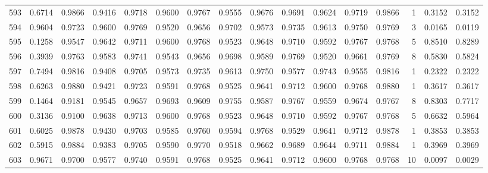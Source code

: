 \begin{tabular}{lrrrrrrrrrrrrrrr}
593 &      0.6714 &  0.9866 &  0.9416 &  0.9718 &  0.9600 &  0.9767 &  0.9555 &  0.9676 &  0.9691 &  0.9624 &   0.9719 &     0.9866 &      1 &                    0.3152 &                     0.3152 \\
594 &      0.9604 &  0.9723 &  0.9600 &  0.9769 &  0.9520 &  0.9656 &  0.9702 &  0.9573 &  0.9735 &  0.9613 &   0.9750 &     0.9769 &      3 &                    0.0165 &                     0.0119 \\
595 &      0.1258 &  0.9547 &  0.9642 &  0.9711 &  0.9600 &  0.9768 &  0.9523 &  0.9648 &  0.9710 &  0.9592 &   0.9767 &     0.9768 &      5 &                    0.8510 &                     0.8289 \\
596 &      0.3939 &  0.9763 &  0.9583 &  0.9741 &  0.9543 &  0.9656 &  0.9698 &  0.9589 &  0.9769 &  0.9520 &   0.9661 &     0.9769 &      8 &                    0.5830 &                     0.5824 \\
597 &      0.7494 &  0.9816 &  0.9408 &  0.9705 &  0.9573 &  0.9735 &  0.9613 &  0.9750 &  0.9577 &  0.9743 &   0.9555 &     0.9816 &      1 &                    0.2322 &                     0.2322 \\
598 &      0.6263 &  0.9880 &  0.9421 &  0.9723 &  0.9591 &  0.9768 &  0.9525 &  0.9641 &  0.9712 &  0.9600 &   0.9768 &     0.9880 &      1 &                    0.3617 &                     0.3617 \\
599 &      0.1464 &  0.9181 &  0.9545 &  0.9657 &  0.9693 &  0.9609 &  0.9755 &  0.9587 &  0.9767 &  0.9559 &   0.9674 &     0.9767 &      8 &                    0.8303 &                     0.7717 \\
600 &      0.3136 &  0.9100 &  0.9638 &  0.9713 &  0.9600 &  0.9768 &  0.9523 &  0.9648 &  0.9710 &  0.9592 &   0.9767 &     0.9768 &      5 &                    0.6632 &                     0.5964 \\
601 &      0.6025 &  0.9878 &  0.9430 &  0.9703 &  0.9585 &  0.9760 &  0.9594 &  0.9768 &  0.9529 &  0.9641 &   0.9712 &     0.9878 &      1 &                    0.3853 &                     0.3853 \\
602 &      0.5915 &  0.9884 &  0.9383 &  0.9705 &  0.9590 &  0.9770 &  0.9518 &  0.9662 &  0.9689 &  0.9644 &   0.9711 &     0.9884 &      1 &                    0.3969 &                     0.3969 \\
603 &      0.9671 &  0.9700 &  0.9577 &  0.9740 &  0.9591 &  0.9768 &  0.9525 &  0.9641 &  0.9712 &  0.9600 &   0.9768 &     0.9768 &     10 &                    0.0097 &                     0.0029 \\

\end{tabular}
